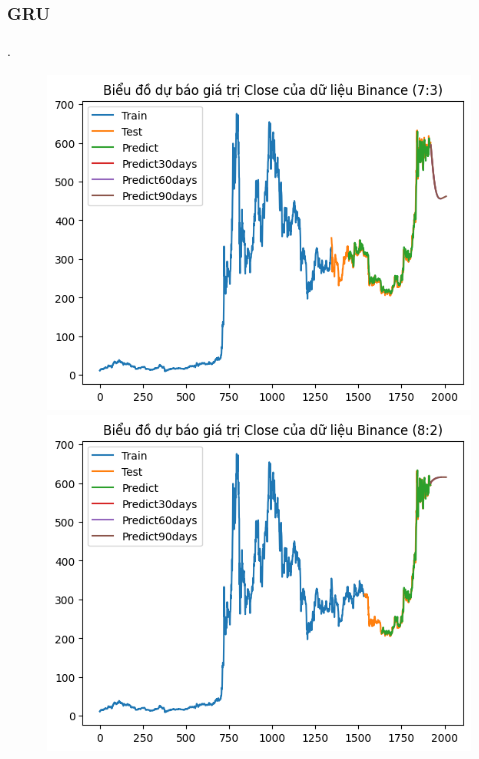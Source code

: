 \documentclass[conference]{IEEEtran}
\begin{document}
	\subsubsection{GRU}.
		\begin{figure}[H]
		\centering
		\begin{minipage}{0.15\textwidth}
			\centering
			\includegraphics[width=1\textwidth]{Figure/GRU_BNB_73.png}
		\end{minipage}
		\hfill
		\begin{minipage}{0.15\textwidth}
			\centering
			\includegraphics[width=1\textwidth]{Figure/GRU_BNB_82.png}
		\end{minipage}

\end{figure}
\end{document}
